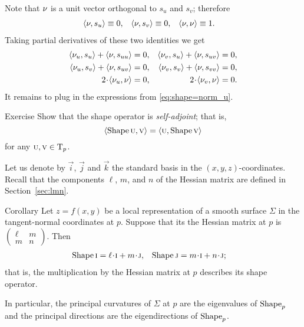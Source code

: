 Note that $\nu$ is a unit vector orthogonal to $s_u$ and $s_v$;
therefore
\begin{align*}
\langle \nu,s_u\rangle&\equiv0,
&
\langle \nu,s_v\rangle&\equiv0,
&
\langle \nu,\nu\rangle&\equiv1.
\end{align*}
Taking partial derivatives of these two identities we get
\begin{align*}
\langle \Norm_u,s_u\rangle+\langle \Norm,s_{uu}\rangle&=0,
&
\langle \Norm_v,s_u\rangle+\langle \Norm,s_{uv}\rangle&=0,
\\
\langle \Norm_u,s_v\rangle+\langle \Norm,s_{uv}\rangle&=0,
&
\langle \Norm_v,s_v\rangle+\langle \Norm,s_{vv}\rangle&=0,
\\
2\cdot\langle \Norm_u,\Norm\rangle&=0,
&
2\cdot\langle \Norm_v,\Norm\rangle&=0.
\end{align*}
It remains to plug in the expressions from \ref{eq:shape=norm_u}.
\qeds

\begin{thm}{Exercise}\label{ex:self-adjoint}
Show that the shape operator is \emph{self-adjoint}; that is,
\[\langle \mathop{\rm Shape}\nolimits\text{\sc{u}},\text{\sc{v}}\rangle=\langle \text{\sc{u}},\mathop{\rm Shape}\nolimits\text{\sc{v}}\rangle\]
for any $\text{\sc{u}},\text{\sc{v}}\in\mathrm{T}_p$.
\end{thm}

Let us denote by $\vec i$, $\vec j$ and $\vec k$ the standard basis in the $(x,y,z)$-coordinates.
Recall that the components $\ell$, $m$, and $n$ of the Hessian matrix are defined in Section~\ref{sec:lmn}.

\begin{thm}{Corollary}\label{cor:Shape(ij)}
Let $z=f(x,y)$ be a local representation of a smooth surface $\Sigma$ in the tangent-normal coordinates at $p$.
Suppose that its the Hessian matrix at $p$ is $(\begin{smallmatrix}
\ell&m\\ m&n
\end{smallmatrix})$.
Then 
\begin{align*}
\Shape\vec i&=\ell\cdot \vec i+m\cdot \vec j,
&
\Shape\vec j&=m\cdot \vec i+n\cdot\vec j;
\end{align*}
that is, the multiplication by the Hessian matrix at $p$ describes its shape operator.

In particular, the principal curvatures of $\Sigma$ at $p$ are the eigenvalues of $\mathop{\rm Shape}\nolimits_p$ and the principal directions are the eigendirections of $\mathop{\rm Shape}\nolimits_p$.
\end{thm}

